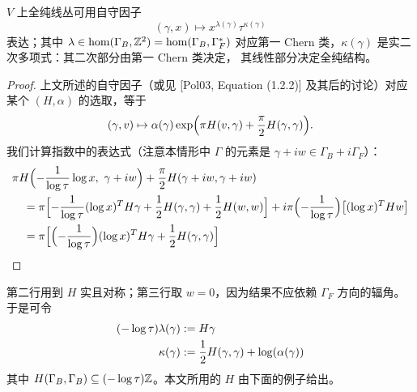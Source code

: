 
\begin{corollary}\label{cor:factor-form}
$V$ 上全纯线丛可用自守因子
\[
(\gamma,x)\mapsto x^{\lambda(\gamma)}\tau^{\kappa(\gamma)}
\]
表达；其中 $\lambda\in\operatorname{hom}(\Gamma_B,\mathbb{Z}^2)
=\operatorname{hom}(\Gamma_B,\Gamma_F^*)$ 对应第一 Chern
类，$\kappa(\gamma)$ 是实二次多项式：其二次部分由第一 Chern 类决定，
其线性部分决定全纯结构。
\end{corollary}

\begin{proof}
上文所述的自守因子（或见 [Pol03, Equation (1.2.2)] 及其后的讨论）对应某个
$(H,\alpha)$ 的选取，等于
\[
(\gamma,v)\mapsto\alpha(\gamma)\exp\Bigl(\pi H(v,\gamma)+\frac{\pi}{2}H(\gamma,\gamma)\Bigr).
\]
我们计算指数中的表达式（注意本情形中 $\Gamma$ 的元素是
$\gamma+iw\in\Gamma_B+i\Gamma_F$）：
\begin{align*}
&\pi H\Bigl(-\frac{1}{\log\tau}\log x,\ \gamma+iw\Bigr)
 +\frac{\pi}{2}H(\gamma+iw,\gamma+iw)\\
&\quad=\pi\Bigl[-\frac{1}{\log\tau}(\log x)^TH\gamma
 +\frac{1}{2}H(\gamma,\gamma)+\frac{1}{2}H(w,w)\Bigr]
 +i\pi\Bigl(-\frac{1}{\log\tau}\Bigr)\bigl[(\log x)^THw\bigr]\\
&\quad=\pi\Bigl[\Bigl(-\frac{1}{\log\tau}\Bigr)(\log x)^TH\gamma
 +\frac{1}{2}H(\gamma,\gamma)\Bigr]
\end{align*}
\end{proof}

第二行用到 $H$ 实且对称；第三行取 $w=0$，因为结果不应依赖 $\Gamma_F$ 方向的辐角。
于是可令
\begin{align}
(-\log\tau)\lambda(\gamma) &:= H\gamma \notag\\
\kappa(\gamma) &:= \frac{1}{2}H(\gamma,\gamma)+\log(\alpha(\gamma))
\label{eq:1-7}
\end{align}
其中 $H(\Gamma_B,\Gamma_B)\subseteq(-\log\tau)\mathbb{Z}$。本文所用的 $H$ 由下面的例子给出。


